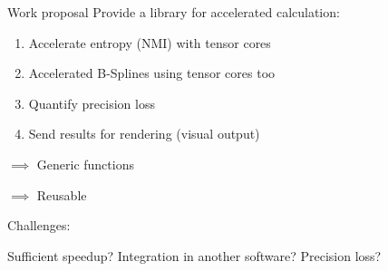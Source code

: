 \begin{frame}{Work proposal}
	Provide a library for accelerated calculation:
	
	\begin{enumerate}
		\item Accelerate entropy (NMI) with tensor cores
		
		\item Accelerated B-Splines using tensor cores too

		\item Quantify precision loss

		\item Send results for rendering (visual output)
	\end{enumerate}

	\hspace{0.035\textwidth} $\implies$ Generic functions
	
	\hspace{0.035\textwidth} $\implies$ Reusable
	
	\hrulefill
	\bigskip
	
	Challenges: 
	
	\hspace{0.035\textwidth}	Sufficient speedup? Integration in another software? Precision loss?
	
\end{frame}